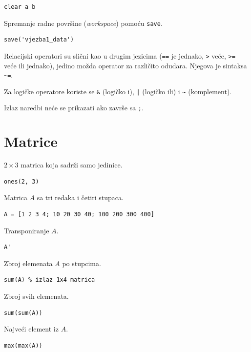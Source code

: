 \documentclass[a4paper, 10pt]{article}
\begin{document}
\begin{lstlisting}
clear a b
\end{lstlisting}

Spremanje radne površine (\textit{workspace}) pomoću \texttt{save}.

\begin{lstlisting}
save('vjezba1_data')
\end{lstlisting}

Relacijski operatori su slični kao u drugim jezicima (\texttt{==} je jednako, \texttt{>} veće, \texttt{>=} veće ili jednako), jedino možda operator za različito odudara. Njegova je sintaksa \texttt{\textasciitilde=}.

Za logičke operatore koriste se \texttt{\&} (logičko i), \texttt{|} (logičko ili) i \texttt{\textasciitilde} (komplement).

Izlaz naredbi neće se prikazati ako završe sa \texttt{;}.

\section{Matrice}

$2 \times 3$ matrica koja sadrži samo jedinice.

\begin{lstlisting}
ones(2, 3)
\end{lstlisting}

Matrica $A$ sa tri redaka i četiri stupaca.

\begin{lstlisting}
A = [1 2 3 4; 10 20 30 40; 100 200 300 400]
\end{lstlisting}

Transponiranje $A$.

\begin{lstlisting}
A'
\end{lstlisting}

Zbroj elemenata $A$ po stupcima.

\begin{lstlisting}
sum(A) % izlaz 1x4 matrica
\end{lstlisting}

Zbroj svih elemenata.

\begin{lstlisting}
sum(sum(A))
\end{lstlisting}

Najveći element iz $A$.

\begin{lstlisting}
max(max(A))
\end{lstlisting}
\end{document}
